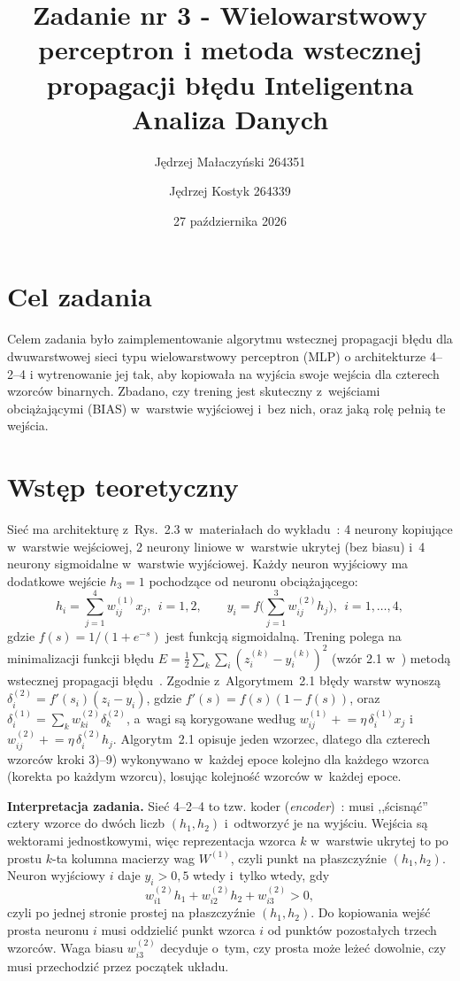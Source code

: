 \documentclass[12pt]{article}
\title{{\bf Zadanie nr 3 - Wielowarstwowy perceptron i metoda wstecznej propagacji błędu}\linebreak
Inteligentna Analiza Danych}
\author{Jędrzej Małaczyński 264351 \and Jędrzej Kostyk 264339}
\date{27 października 2026}
\begin{document}
\clearpage\maketitle
\thispagestyle{empty}
\newpage
\setcounter{page}{1}
\section{Cel zadania}

Celem zadania było zaimplementowanie algorytmu wstecznej propagacji błędu dla dwuwarstwowej
sieci typu wielowarstwowy perceptron (MLP) o architekturze 4--2--4 i wytrenowanie jej tak, aby
kopiowała na wyjścia swoje wejścia dla czterech wzorców binarnych. Zbadano, czy trening jest
skuteczny z~wejściami obciążającymi (BIAS) w~warstwie wyjściowej i~bez nich, oraz jaką rolę
pełnią te wejścia.

\section{Wstęp teoretyczny}

Sieć ma architekturę z~Rys.~2.3 w~materiałach do wykładu~\cite{wyklad2}: 4 neurony kopiujące
w~warstwie wejściowej, 2 neurony liniowe w~warstwie ukrytej (bez biasu) i~4 neurony sigmoidalne
w~warstwie wyjściowej. Każdy neuron wyjściowy ma dodatkowe wejście $h_3=1$ pochodzące od
neuronu obciążającego:
\begin{equation}
 h_i = \sum_{j=1}^{4} w_{ij}^{(1)} x_j,\ \ i=1,2, \qquad
 y_i = f\Big(\sum_{j=1}^{3} w_{ij}^{(2)} h_j\Big),\ \ i=1,\dots,4,
 \label{eq_forward}
\end{equation}
gdzie $f(s)=1/(1+e^{-s})$ jest funkcją sigmoidalną.
Trening polega na minimalizacji funkcji błędu
$E=\tfrac12\sum_{k}\sum_{i}(z_i^{(k)}-y_i^{(k)})^2$ (wzór 2.1 w~\cite{wyklad2}) metodą
wstecznej propagacji błędu~\cite{rumelhart1986}. Zgodnie z~Algorytmem~2.1 błędy warstw
wynoszą $\delta_i^{(2)}=f'(s_i)(z_i-y_i)$, gdzie $f'(s)=f(s)(1-f(s))$, oraz
$\delta_i^{(1)}=\sum_{k} w_{ki}^{(2)}\delta_k^{(2)}$, a~wagi są korygowane według
$w_{ij}^{(1)} \mathrel{+}= \eta\,\delta_i^{(1)}x_j$ i~$w_{ij}^{(2)} \mathrel{+}= \eta\,\delta_i^{(2)}h_j$.
Algorytm~2.1 opisuje jeden wzorzec, dlatego dla czterech wzorców kroki 3)--9) wykonywano
w~każdej epoce kolejno dla każdego wzorca (korekta po każdym wzorcu), losując kolejność
wzorców w~każdej epoce.

\textbf{Interpretacja zadania.} Sieć 4--2--4 to tzw. koder (\textit{encoder})~\cite{ackley1985}:
musi ,,ścisnąć'' cztery wzorce do dwóch liczb $(h_1,h_2)$ i~odtworzyć je na wyjściu. Wejścia są
wektorami jednostkowymi, więc reprezentacja wzorca $k$ w~warstwie ukrytej to po prostu
$k$-ta kolumna macierzy wag $W^{(1)}$, czyli punkt na płaszczyźnie $(h_1,h_2)$. Neuron wyjściowy $i$
daje $y_i>0{,}5$ wtedy i~tylko wtedy, gdy
\begin{equation}
 w_{i1}^{(2)}h_1 + w_{i2}^{(2)}h_2 + w_{i3}^{(2)} > 0 ,
 \label{eq_line}
\end{equation}
czyli po jednej stronie prostej na płaszczyźnie $(h_1,h_2)$. Do kopiowania wejść prosta neuronu $i$
musi oddzielić punkt wzorca $i$ od punktów pozostałych trzech wzorców. Waga biasu $w_{i3}^{(2)}$
decyduje o~tym, czy prosta może leżeć dowolnie, czy musi przechodzić przez początek układu.
\end{document}
